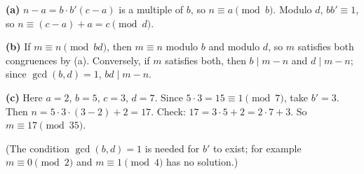 \textbf{(a)} $n-a=b\cdot b'(c-a)$ is a multiple of $b$, so $n\equiv a\pmod b$. Modulo $d$, $bb'\equiv1$, so $n\equiv(c-a)+a=c\pmod d$.

\textbf{(b)} If $m\equiv n\pmod{bd}$, then $m\equiv n$ modulo $b$ and modulo $d$, so $m$ satisfies both congruences by (a). Conversely, if $m$ satisfies both, then $b\mid m-n$ and $d\mid m-n$; since $\gcd(b,d)=1$, $bd\mid m-n$.

\textbf{(c)} Here $a=2$, $b=5$, $c=3$, $d=7$. Since $5\cdot3=15\equiv1\pmod7$, take $b'=3$. Then $n=5\cdot3\cdot(3-2)+2=17$. Check: $17=3\cdot5+2=2\cdot7+3$. So $\boxed{m\equiv17\pmod{35}}$.

(The condition $\gcd(b,d)=1$ is needed for $b'$ to exist; for example $m\equiv0\pmod2$ and $m\equiv1\pmod4$ has no solution.)
